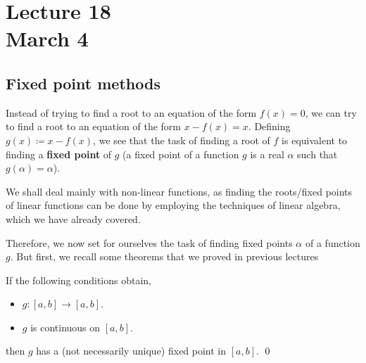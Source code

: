 \chapter*{Lecture 18 \\ March 4}
\setcounter{chapter}{18}
\setcounter{section}{0}

\section{Fixed point methods}

Instead of trying to find a root to an equation of the form $f(x) = 0$, we can try to find a root to an equation of the form $x - f(x) = x$. Defining $g(x) \coloneqq x - f(x)$, we see that the task of finding a root of $f$ is equivalent to finding a \textbf{fixed point} of $g$ (a fixed point of a function $g$ is a real $\alpha$ such that $g(\alpha) = \alpha$).

We shall deal mainly with non-linear functions, as finding the roots/fixed points of linear functions can be done by employing the techniques of linear algebra, which we have already covered.

Therefore, we now set for ourselves the task of finding fixed points $\alpha$ of a function $g$. But first, we recall some theorems that we proved in previous lectures

\begin{thm}
  \hfill
  
  If the following conditions obtain,
  \begin{itemize}
  \item
    $g \colon [a, b] \to [a, b]$.
    
  \item
    $g$ is continuous on $[a, b]$.
    
  \end{itemize}
  then $g$ has a (not necessarily unique) fixed point in $[a, b]$.
  \hfill\qed
\end{thm}

